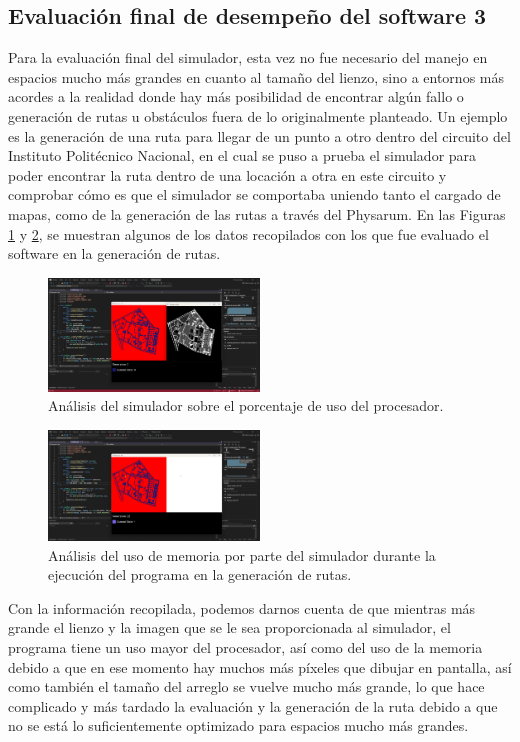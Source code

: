 \subsection{Evaluaci\'on final de desempe\~no del software 3}

    Para la evaluaci\'on final del simulador, esta vez no fue necesario del manejo en espacios
        mucho m\'as grandes en cuanto al tama\~no del lienzo, sino a entornos m\'as acordes a la realidad
        donde hay m\'as posibilidad de encontrar alg\'un fallo o generaci\'on de rutas u obst\'aculos fuera
        de lo originalmente planteado. Un ejemplo es la generaci\'on de una ruta para llegar de un
        punto a otro dentro del circuito del Instituto Polit\'ecnico Nacional, en el cual se puso a prueba
        el simulador para poder encontrar la ruta dentro de una locaci\'on a otra en este circuito y
        comprobar c\'omo es que el simulador se comportaba uniendo tanto el cargado de mapas, como
        de la generaci\'on de las rutas a trav\'es del Physarum.
    \vskip 0.5cm
    En las Figuras \ref{fig:90} y \ref{fig:91}, se muestran algunos de los datos recopilados con los que fue evaluado el
    software en la generaci\'on de rutas.
    \vskip 0.5cm
    \begin{figure}[htbp]
        \centering
        \includegraphics[width=0.5\textwidth]{./images/Pruebas/simulador/image090.png}
        \caption{An\'alisis del simulador sobre el porcentaje de uso del procesador.}
        \label{fig:90}
    \end{figure}
    \vskip 0.5cm
    \begin{figure}[htbp]
        \centering
        \includegraphics[width=0.5\textwidth]{./images/Pruebas/simulador/image091.png}
        \caption{An\'alisis del uso de memoria por parte del simulador durante la ejecuci\'on del programa en la
        generaci\'on de rutas.}
        \label{fig:91}
    \end{figure}
    \vskip 0.5cm
    Con la informaci\'on recopilada, podemos darnos cuenta de que mientras m\'as grande el lienzo
        y la imagen que se le sea proporcionada al simulador, el programa tiene un uso mayor del
        procesador, as\'i como del uso de la memoria debido a que en ese momento hay muchos m\'as
        p\'ixeles que dibujar en pantalla, as\'i como tambi\'en el tama\~no del arreglo se vuelve mucho m\'as
        grande, lo que hace complicado y m\'as tardado la evaluaci\'on y la generaci\'on de la ruta debido
        a que no se est\'a lo suficientemente optimizado para espacios mucho m\'as grandes.
